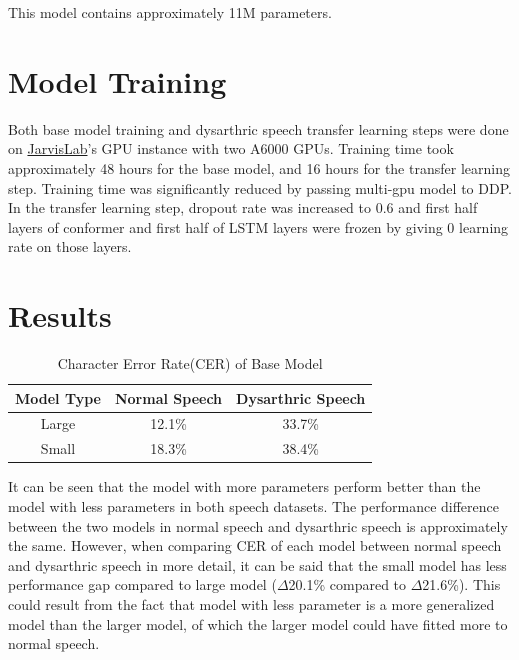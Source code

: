 \documentclass[9pt,final,a4paper]{IEEEtran}
\begin{document}
This model contains approximately 11M parameters.

\section{Model Training}

Both base model training and dysarthric speech transfer learning steps were done on \href{https://jarvislabs.ai/}{JarvisLab}'s GPU instance with two A6000 GPUs.
Training time took approximately 48 hours for the base model, and 16 hours for the transfer learning step.
Training time was significantly reduced by passing multi-gpu model to DDP.
In the transfer learning step, dropout rate was increased to 0.6 and first half layers of conformer and first half of LSTM layers were frozen by giving 0 learning rate on those layers.

\section{Results}
\vspace*{-2ex}
\begin{table}[ht]
    \caption*{Character Error Rate(CER) of Base Model}
    \vspace*{-3mm}
    \begin{center}
        \begin{tabular}{|c|c|c|}
            \hline
            Model Type & Normal Speech & Dysarthric Speech \\ [0.5ex] 
            \hline\hline
            Large & 12.1\% & 33.7\% \\ 
            \hline
            Small & 18.3\% & 38.4\% \\
            \hline
        \end{tabular}
    \end{center}
\end{table}

It can be seen that the model with more parameters perform better than the model with less parameters in both speech datasets.
The performance difference between the two models in normal speech and dysarthric speech is approximately the same.
However, when comparing CER of each model between normal speech and dysarthric speech in more detail, it can be said that the small model has less performance gap compared to large model ($\Delta$20.1\% compared to $\Delta$21.6\%).
This could result from the fact that model with less parameter is a more generalized model than the larger model, of which the larger model could have fitted more to normal speech.
\end{document}
